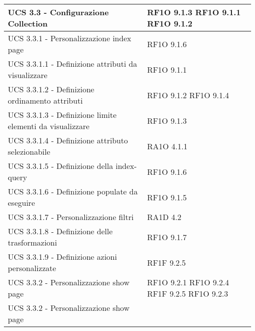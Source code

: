 \begin{center}
\begin{longtable}{ | p{5cm} | p{5cm} |}
            UCS 3.3  - Configurazione Collection &  RF1O 9.1.3 \newline  RF1O 9.1.1 \newline  RF1O 9.1.2 \newline  \\ \hline      
            UCS 3.3.1 - Personalizzazione index page &  RF1O 9.1.6 \newline  \\ \hline      
            UCS 3.3.1.1  - Definizione attributi da visualizzare &  RF1O 9.1.1 \newline  \\ \hline      
            UCS 3.3.1.2  -  Definizione ordinamento attributi &  RF1O 9.1.2 \newline  RF1O 9.1.4 \newline  \\ \hline      
            UCS 3.3.1.3  - Definizione limite elementi da visualizzare &  RF1O 9.1.3 \newline  \\ \hline      
            UCS 3.3.1.4 - Definizione attributo selezionabile &  RA1O 4.1.1 \newline  \\ \hline      
            UCS 3.3.1.5 - Definizione della index-query &  RF1O 9.1.6 \newline  \\ \hline      
            UCS 3.3.1.6 - Definizione populate da eseguire &  RF1O 9.1.5 \newline  \\ \hline      
            UCS 3.3.1.7 - Personalizzazione filtri &  RA1D 4.2 \newline  \\ \hline      
            UCS 3.3.1.8 - Definizione delle trasformazioni &  RF1O 9.1.7 \newline  \\ \hline      
            UCS 3.3.1.9 - Definizione azioni personalizzate &  RF1F 9.2.5 \newline  \\ \hline      
            UCS 3.3.2  -  Personalizzazione show page &  RF1O 9.2.1 \newline  RF1O 9.2.4 \newline  RF1F 9.2.5 \newline  RF1O 9.2.3 \newline  \\ \hline      
            UCS 3.3.2 - Personalizzazione show page &  \\ \hline      

\end{longtable}
\end{center}
